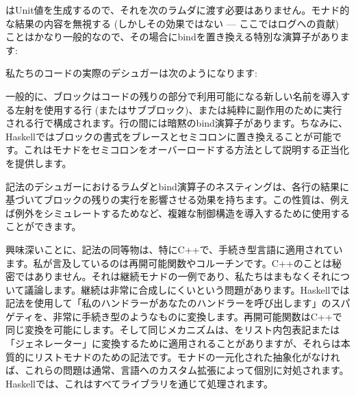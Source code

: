 はUnit値を生成するので、それを次のラムダに渡す必要はありません。モナド的な結果の内容を無視する (しかしその効果ではない --- ここではログへの貢献) ことはかなり一般的なので、その場合にbindを置き換える特別な演算子があります: 

私たちのコードの実際のデシュガーは次のようになります: 

一般的に、ブロックはコードの残りの部分で利用可能になる新しい名前を導入する左射を使用する行 (またはサブブロック)、または純粋に副作用のために実行される行で構成されます。行の間には暗黙のbind演算子があります。ちなみに、Haskellではブロックの書式をブレースとセミコロンに置き換えることが可能です。これはモナドをセミコロンをオーバーロードする方法として説明する正当化を提供します。

記法のデシュガーにおけるラムダとbind演算子のネスティングは、各行の結果に基づいてブロックの残りの実行を影響させる効果を持ちます。この性質は、例えば例外をシミュレートするためなど、複雑な制御構造を導入するために使用することができます。

興味深いことに、記法の同等物は、特にC++で、手続き型言語に適用されています。私が言及しているのは再開可能関数やコルーチンです。C++のことは秘密ではありません。それは継続モナドの一例であり、私たちはまもなくそれについて議論します。継続は非常に合成しにくいという問題があります。Haskellでは記法を使用して「私のハンドラーがあなたのハンドラーを呼び出します」のスパゲティを、非常に手続き型のようなものに変換します。再開可能関数はC++で同じ変換を可能にします。そして同じメカニズムは、をリスト内包表記または「ジェネレーター」に変換するために適用されることがありますが、それらは本質的にリストモナドのための記法です。モナドの一元化された抽象化がなければ、これらの問題は通常、言語へのカスタム拡張によって個別に対処されます。Haskellでは、これはすべてライブラリを通じて処理されます。

